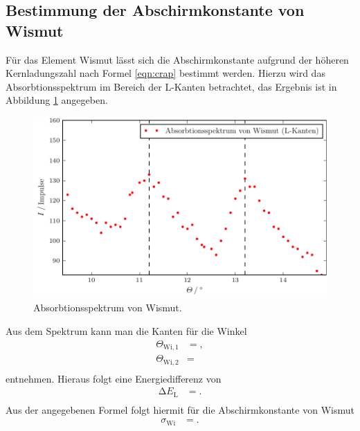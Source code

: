 \subsection{Bestimmung der Abschirmkonstante von Wismut}
Für das Element Wismut lässt sich die Abschirmkonstante aufgrund der höheren Kernladungszahl nach Formel \eqref{eqn:crap} bestimmt werden.
Hierzu wird das Absorbtionsspektrum im Bereich der L-Kanten betrachtet, das Ergebnis ist in Abbildung \ref{fig:plot8} angegeben.
\begin{figure}
  \centering
  \includegraphics{build/plot_wi.pdf}
  \caption{Absorbtionsspektrum von Wismut.}
  \label{fig:plot8}
\end{figure}
Aus dem Spektrum kann man die Kanten für die Winkel
\begin{align*}
  \Theta_{\text{Wi},1} &= , \\
  \Theta_{\text{Wi},2} &=  \\
\end{align*}
entnehmen.
Hieraus folgt eine Energiedifferenz von
\begin{align*}
  \increment E_\text{L} &= . \\
\end{align*}
Aus der angegebenen Formel folgt hiermit für die Abschirmkonstante von Wismut
\begin{align*}
  \sigma_{\text{Wi}} &= . \\
\end{align*}
